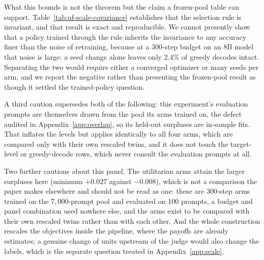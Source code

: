 \documentclass{article}
\theoremstyle{remark}
\theoremstyle{plain}
\begin{document}
What this bounds is not the theorem but the claim a frozen-pool table can support.
Table~\ref{tab:uf-scale-covariance} establishes that the selection rule is invariant, and that result is
exact and reproducible. We cannot presently show that a policy trained through the rule inherits the
invariance to any accuracy finer than the noise of retraining, because at a $300$-step budget on an $8$B
model that noise is large: a seed change alone leaves only $2.4\%$ of greedy decodes intact. Separating the
two would require either a converged optimizer or many seeds per arm, and we report the negative rather
than presenting the frozen-pool result as though it settled the trained-policy question.

A third caution supersedes both of the following: this experiment's evaluation prompts are themselves
drawn from the pool its arms trained on, the defect audited in Appendix~\ref{app:overlap}, so its
held-out surpluses are in-sample fits. That inflates the levels but applies identically to all four arms,
which are compared only with their own rescaled twins, and it does not touch the target-level or
greedy-decode rows, which never consult the evaluation prompts at all.

Two further cautions about this panel. The utilitarian arms attain the larger surpluses here
(minimum $+0.027$ against $-0.008$), which is not a comparison the paper makes elsewhere and should not be
read as one: these are $300$-step arms trained on the $7{,}000$-prompt pool and evaluated on $100$ prompts,
a budget and panel combination used nowhere else, and the arms exist to be compared with their own
rescaled twins rather than with each other. And the whole construction rescales the objectives inside the
pipeline, where the payoffs are already estimates; a genuine change of units upstream of the judge would
also change the labels, which is the separate question treated in Appendix~\ref{app:scale}.
\end{document}
